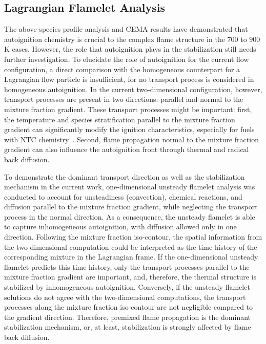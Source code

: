\documentclass[review,3p,times]{elsarticle}
\begin{document}
\subsection{Lagrangian Flamelet Analysis} \label{sec:LFA}
The above species profile analysis and CEMA results have demonstrated that autoignition chemistry is crucial to the complex flame structure in the $700$ to $900$ K cases.  However, the role that autoignition plays in the stabilization still needs further investigation.  To elucidate the role of autoignition for the current flow configuration, a direct comparison with the homogeneous counterpart for a Lagrangian flow particle is insufficient, \textcolor{mycolor}{for no transport process is considered in homogeneous autoignition.  In the current two-dimensional configuration, however, transport processes are present in two directions: parallel and normal to the mixture fraction gradient.  These transport processes might be important: first, the temperature and species stratification parallel to the mixture fraction gradient can significantly modify the ignition characteristics, especially for fuels with NTC chemistry~\cite{law12,deng14}.  Second, flame propagation normal to the mixture fraction gradient can also influence the autoignition front through thermal and radical back diffusion.}

\textcolor{mycolor}{To demonstrate the dominant transport direction as well as the stabilization mechanism in the current work, one-dimensional unsteady flamelet analysis was conducted to account for unsteadiness (convection), chemical reactions, and diffusion parallel to the mixture fraction gradient, while neglecting the transport process in the normal direction.  As a consequence, the unsteady flamelet is able to capture inhomogeneous autoignition, with diffusion allowed only in one direction.  Following the mixture fraction iso-contour, the spatial information from the two-dimensional computation could be interpreted as the time history of the corresponding mixture in the Lagrangian frame.  If the one-dimensional unsteady flamelet predicts this time history, only the transport processes parallel to the mixture fraction gradient are important, and, therefore, the thermal structure is stabilized by inhomogeneous autoignition.  Conversely, if the unsteady flamelet solutions do not agree with the two-dimensional computations, the transport processes along the mixture fraction iso-contour are not negligible compared to the gradient direction.  Therefore, premixed flame propagation is the dominant stabilization mechanism, or, at least, stabilization is strongly affected by flame back diffusion.}
\end{document}
